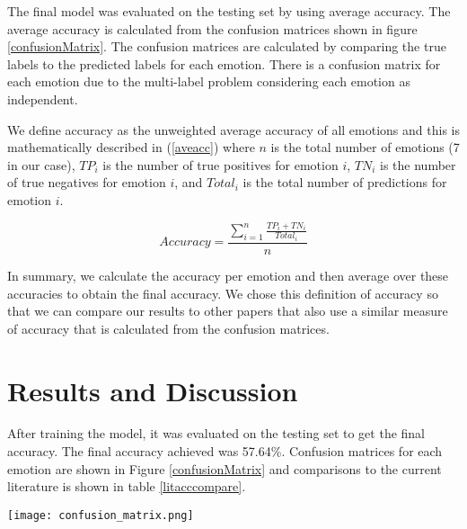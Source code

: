 The final model was evaluated on the testing set by using average accuracy. The average accuracy is calculated from the confusion matrices shown in figure \ref{confusionMatrix}. The confusion matrices are calculated by comparing the true labels to the predicted labels for each emotion. There is a confusion matrix for each emotion due to the multi-label problem considering each emotion as independent.

We define accuracy as the unweighted average accuracy of all emotions and this is mathematically described in (\ref{aveacc}) where $n$ is the total number of emotions (7 in our case), $TP_{i}$ is the number of true positives for emotion $i$, $TN_{i}$ is the number of true negatives for emotion $i$, and $Total_{i}$ is the total number of predictions for emotion $i$.

\begin{equation}
	\label{aveacc}
	Accuracy = \frac{\sum_{i=1}^{n}\frac{TP_{i} + TN_{i}}{Total_{i}}}{n}
\end{equation}

In summary, we calculate the accuracy per emotion and then average over these accuracies to obtain the final accuracy. We chose this definition of accuracy so that we can compare our results to other papers that also use a similar measure of accuracy that is calculated from the confusion matrices.

\section{Results and Discussion}

After training the model, it was evaluated on the testing set to get the final accuracy. The final accuracy achieved was 57.64\%. Confusion matrices for each emotion are shown in Figure \ref{confusionMatrix} and comparisons to the current literature is shown in table \ref{litacccompare}.

\begin{figure*}
	\centering
	\hspace{6mm}
	\texttt{[image: confusion\_matrix.png]}
	\caption{Confusion matrices for each emotion.}
	\label{confusionMatrix}
\end{figure*}

